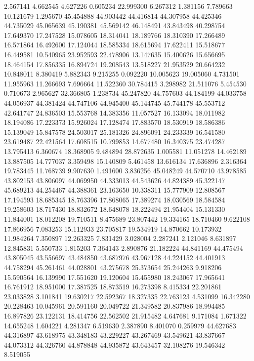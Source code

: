 2.567141
4.662545
4.627226
0.605234
22.999300
6.267312
1.381156
7.789663
10.121679
1.295670
45.454888
44.903442
44.416814
44.307958
44.425346
44.735029
45.065639
45.190381
45.569142
46.148491
43.843498
40.298754
17.649370
17.247528
15.078605
18.314041
18.189766
18.310390
17.266489
16.571864
16.492600
17.124044
18.585334
18.615694
17.622411
15.518677
16.449581
10.540965
23.952593
22.478906
13.147635
15.400626
15.656695
18.464154
17.856335
16.894724
19.208543
13.518227
21.953529
20.664232
10.848011
8.380419
5.882343
9.215255
0.092220
10.005623
19.005060
4.731501
11.955963
11.266693
7.696664
11.522360
30.784415
3.298982
21.511076
5.454530
0.710673
2.965627
32.366805
1.238734
45.247820
44.757603
44.184199
44.033758
44.056937
44.381424
44.747106
44.945400
45.144745
45.744178
45.553712
42.641747
24.836503
15.553768
14.383356
11.057527
16.133094
18.011982
18.194086
17.223373
15.926024
17.128474
17.883570
18.530919
18.586386
15.139049
15.847578
24.503017
25.181326
24.896091
24.233339
16.541580
23.619487
22.421564
17.608515
10.799853
14.677480
16.340375
23.474287
13.795413
6.360674
18.368905
9.484894
28.872635
1.005581
11.051278
14.462189
13.887505
14.777037
3.359498
15.140809
5.461458
13.616134
17.636896
2.316364
19.783445
11.768739
9.907630
1.491600
3.836256
45.048249
44.570710
43.978585
43.802153
43.806097
44.069950
44.333013
44.543626
44.824389
45.322147
45.689213
44.254467
44.388361
23.163650
10.338311
15.777909
12.808567
17.194593
18.685345
18.763396
17.868065
17.389274
18.030569
18.584584
19.258603
18.717430
18.832672
18.648078
18.222494
21.954404
15.131330
11.844001
18.012208
19.710511
8.475689
23.807442
19.334165
18.710460
9.622108
17.866956
7.083253
15.112933
23.705817
19.534919
14.870662
10.173932
11.984264
7.350897
12.263325
7.831429
3.028004
2.287241
2.121046
8.631897
12.845831
5.550733
1.815203
7.364143
2.890876
21.182224
44.841169
44.475494
43.805045
43.556697
43.484850
43.687976
43.967128
44.224152
44.401913
44.758294
45.261461
44.028801
43.275678
25.373654
25.244263
9.918206
15.590564
16.139990
17.551620
19.120604
15.455980
18.243067
17.965641
16.761912
18.951000
17.387525
18.873519
16.273398
8.415334
22.201861
23.033828
3.101841
19.630217
22.592367
18.327335
22.763123
4.531099
16.342280
20.228463
10.045961
20.591160
20.049722
21.349582
20.837986
18.994485
16.897826
23.122131
18.414756
22.562502
21.915482
4.647681
9.171084
1.671322
14.655248
1.604221
4.281347
6.519630
2.387890
8.401070
0.259979
44.627683
44.316897
43.618975
43.348183
43.229227
43.267469
43.549621
43.837667
44.073312
44.326760
44.878848
44.935872
43.643457
32.108276
19.546342
8.519055
